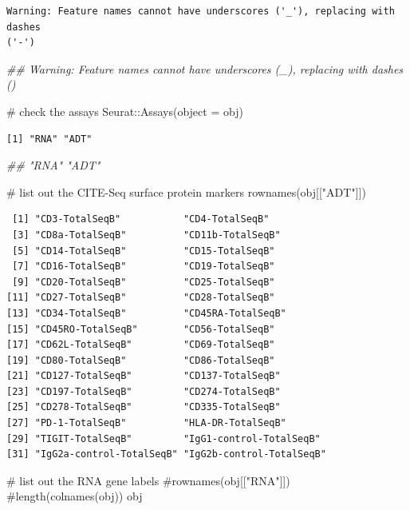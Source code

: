 \documentclass[
  letterpaper,
  DIV=11,
  numbers=noendperiod]{scrartcl}
\newenvironment{Shaded}{\begin{snugshade}}{\end{snugshade}}
\newcommand{\AttributeTok}[1]{\textcolor[rgb]{0.40,0.45,0.13}{#1}}
\newcommand{\CommentTok}[1]{\textcolor[rgb]{0.37,0.37,0.37}{#1}}
\newcommand{\DocumentationTok}[1]{\textcolor[rgb]{0.37,0.37,0.37}{\textit{#1}}}
\newcommand{\FunctionTok}[1]{\textcolor[rgb]{0.28,0.35,0.67}{#1}}
\newcommand{\NormalTok}[1]{\textcolor[rgb]{0.00,0.23,0.31}{#1}}
\newcommand{\SpecialCharTok}[1]{\textcolor[rgb]{0.37,0.37,0.37}{#1}}
\newcommand{\StringTok}[1]{\textcolor[rgb]{0.13,0.47,0.30}{#1}}
\begin{document}
\begin{verbatim}
Warning: Feature names cannot have underscores ('_'), replacing with dashes
('-')
\end{verbatim}

\begin{Shaded}
\begin{Highlighting}[]
\DocumentationTok{\#\# Warning: Feature names cannot have underscores (\textquotesingle{}\_\textquotesingle{}), replacing with dashes (\textquotesingle{}{-}\textquotesingle{})}

\CommentTok{\# check the assays}
\NormalTok{Seurat}\SpecialCharTok{::}\FunctionTok{Assays}\NormalTok{(}\AttributeTok{object =}\NormalTok{ obj)}
\end{Highlighting}
\end{Shaded}

\begin{verbatim}
[1] "RNA" "ADT"
\end{verbatim}

\begin{Shaded}
\begin{Highlighting}[]
\DocumentationTok{\#\# "RNA" "ADT"}

\CommentTok{\# list out the CITE{-}Seq surface protein markers}
\FunctionTok{rownames}\NormalTok{(obj[[}\StringTok{"ADT"}\NormalTok{]])}
\end{Highlighting}
\end{Shaded}

\begin{verbatim}
 [1] "CD3-TotalSeqB"           "CD4-TotalSeqB"          
 [3] "CD8a-TotalSeqB"          "CD11b-TotalSeqB"        
 [5] "CD14-TotalSeqB"          "CD15-TotalSeqB"         
 [7] "CD16-TotalSeqB"          "CD19-TotalSeqB"         
 [9] "CD20-TotalSeqB"          "CD25-TotalSeqB"         
[11] "CD27-TotalSeqB"          "CD28-TotalSeqB"         
[13] "CD34-TotalSeqB"          "CD45RA-TotalSeqB"       
[15] "CD45RO-TotalSeqB"        "CD56-TotalSeqB"         
[17] "CD62L-TotalSeqB"         "CD69-TotalSeqB"         
[19] "CD80-TotalSeqB"          "CD86-TotalSeqB"         
[21] "CD127-TotalSeqB"         "CD137-TotalSeqB"        
[23] "CD197-TotalSeqB"         "CD274-TotalSeqB"        
[25] "CD278-TotalSeqB"         "CD335-TotalSeqB"        
[27] "PD-1-TotalSeqB"          "HLA-DR-TotalSeqB"       
[29] "TIGIT-TotalSeqB"         "IgG1-control-TotalSeqB" 
[31] "IgG2a-control-TotalSeqB" "IgG2b-control-TotalSeqB"
\end{verbatim}

\begin{Shaded}
\begin{Highlighting}[]
\CommentTok{\# list out the RNA gene labels}
\CommentTok{\#rownames(obj[["RNA"]])}
\CommentTok{\#length(colnames(obj))}
\NormalTok{obj}
\end{Highlighting}
\end{Shaded}
\end{document}
